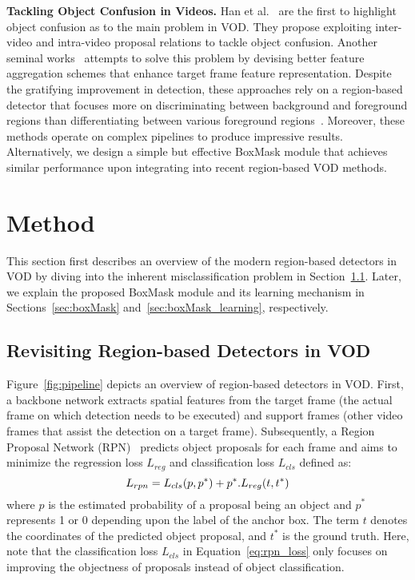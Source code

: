 \documentclass[10pt,twocolumn,letterpaper]{article}
\begin{document}
\noindent \textbf{Tackling Object Confusion in Videos.}
Han et al.~\cite{han2020mining} are the first to highlight object confusion as to the main problem in VOD. They propose exploiting inter-video and intra-video proposal relations to tackle object confusion. Another seminal works~\cite{han2020exploiting, han2021class} attempts to solve this problem by devising better feature aggregation schemes that enhance target frame feature representation. Despite the gratifying improvement in detection, these approaches rely on a region-based detector that focuses more on discriminating between background and foreground regions than differentiating between various foreground regions~\cite{cheng2018revisiting}. Moreover, these methods operate on complex pipelines to produce impressive results. Alternatively, we design a simple but effective BoxMask module that achieves similar performance upon integrating into recent region-based VOD methods.


\section{Method}
This section first describes an overview of the modern region-based detectors in VOD by diving into the inherent misclassification problem in Section~\ref{sec:region_based_vod}. Later, we explain the proposed BoxMask module and its learning mechanism in Sections~\ref{sec:boxMask} and~\ref{sec:boxMask_learning}, respectively.


\subsection{Revisiting Region-based Detectors in VOD}
\label{sec:region_based_vod}
Figure~\ref{fig:pipeline} depicts an overview of region-based detectors in VOD. First, a backbone network extracts spatial features from the target frame (the actual frame on which detection needs to be executed) and support frames (other video frames that assist the detection on a target frame). Subsequently, a Region Proposal Network (RPN)~\cite{ren2015faster} predicts object proposals for each frame and aims to minimize the regression loss $L_{reg}$ and classification loss $L_{cls}$ defined as:
\begin{equation}
\vspace{-2pt}
\label{eq:rpn_loss}
     L_{rpn} = L_{cls}(p,p^{*}) + p^*.L_{reg}(t, t^{*}) 
\end{equation}
where $p$ is the estimated probability of a proposal being an object and $p^*$ represents 1 or 0 depending upon the label of the anchor box. The term $t$ denotes the coordinates of the predicted object proposal, and $t^*$ is the ground truth. Here, note that the classification loss $L_{cls}$ in Equation~\ref{eq:rpn_loss} only focuses on improving the objectness of proposals instead of object classification.
\end{document}
